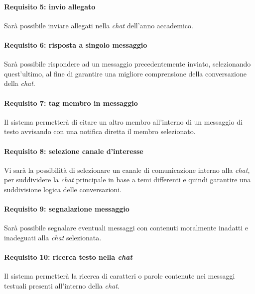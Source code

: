 \paragraph{Requisito 5: invio allegato\\}
Sarà possibile inviare allegati nella \emph{chat} dell’anno accademico.

\paragraph{Requisito 6: risposta a singolo messaggio\\}
Sarà possibile rispondere ad un messaggio precedentemente inviato, selezionando quest’ultimo, al fine di garantire una migliore comprensione della conversazione della \emph{chat}.

\paragraph{Requisito 7: tag membro in messaggio\\}
Il sistema permetterà di citare un altro membro all’interno di un messaggio di testo avvisando con una notifica diretta il membro selezionato.

\paragraph{Requisito 8: selezione canale d'interesse\\}
Vi sarà la possibilità di selezionare un canale di comunicazione interno alla \emph{chat}, per suddividere la \emph{chat} principale in base a temi differenti e quindi garantire una suddivisione logica delle conversazioni.

\paragraph{Requisito 9: segnalazione messaggio\\}
Sarà possibile segnalare eventuali messaggi con contenuti moralmente inadatti e inadeguati alla \emph{chat} selezionata.

\paragraph{Requisito 10: ricerca testo nella \emph{chat}\\}
Il sistema permetterà la ricerca di caratteri o parole contenute nei messaggi testuali presenti all’interno della \emph{chat}.

